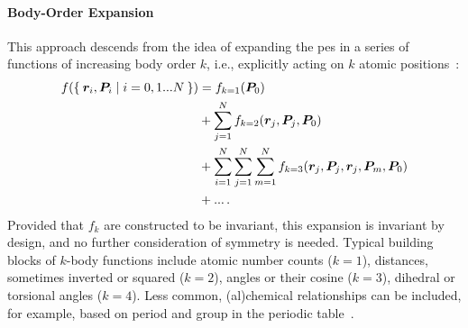 \paragraph{Body-Order Expansion} This approach descends from the idea of expanding the \gls{pes} in a series of functions of increasing body order $k$, i.e., explicitly acting on $k$ atomic positions~\cite{es1994p}:
\begin{align}
	f(\Set{\boldsymbol{r}_i, \boldsymbol{P}_i | i=0, 1...N}) &= f_{k=1}(\boldsymbol{P}_0) \\
	&+  \sum_{j=1}^N f_{k{=}2}(\boldsymbol{r}_j, \boldsymbol{P}_j, \boldsymbol{P}_0) \\
	&+  \sum_{i=1}^N \sum_{j=1}^N \sum_{m=1}^N f_{k{=}3}(\boldsymbol{r}_j, \boldsymbol{P}_j, \boldsymbol{r}_j, \boldsymbol{P}_m, \boldsymbol{P}_0) \\
	&+ ... \, .
\end{align}
Provided that $f_k$ are constructed to be invariant, this expansion is invariant by design, and no further consideration of symmetry is needed. 
Typical building blocks of $k$-body functions include 
atomic number counts ($k{=}1$),
distances, sometimes inverted or squared ($k{=}2$),
angles or their cosine ($k{=}3$),
dihedral or torsional angles ($k{=}4$). %
Less common, (al)chemical relationships can be included, for example, based on period and group in the periodic table~\cite{fchl2018q}.

